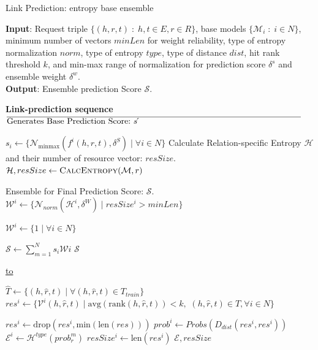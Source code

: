 \documentclass{article}
\begin{document}
\begin{algorithm}[!htb]
    \caption{Link Prediction: entropy base ensemble}
    \label{alg:linkPredictOverview}
    \textbf{Input}: Request triple $\{(h, r, t) \;:\; h,t \in E, r \in R\}$, base models $\{\mathcal{M}_i \;:\; i \in N\}$, minimum number of vectors $minLen$ for weight reliability, type of entropy normalization $norm$, type of entropy $\mathit{type}$, type of distance $\mathit{dist}$, hit rank threshold $k$, and min-max range of normalization for prediction score $\delta^{s}$ and ensemble weight $\delta^{w}$.\\
    \textbf{Output}: Ensemble prediction Score $\mathcal{S}$.
    
    \begin{algorithmic}[1] %

        \Statex \hrulefill
        \Statex \textbf{Link-prediction sequence}
        \Statex \noindent$\overline{\makebox[\linewidth]{\text{Generates Base Prediction Score:} $s\acute{}$ \hfill}}$
        
        \State $s\acute{}_i \leftarrow \{\mathcal{N}_{\text{minmax}}(f^i(h, r, t), \delta^{S}) \;|\; \forall i \in N\}$    
        \Statex Calculate Relation-specific Entropy $\mathcal{H}$ and their number of resource vector: $resSize$.
        \State $\mathcal{H}, resSize \leftarrow \Call{CalcEntropy}{\mathcal{M}, r}$

        \Statex Ensemble for Final Prediction Score: $\mathcal{S}$.
        \State $\mathcal{W}^i \leftarrow \{\mathcal{N}_{norm}(\mathcal{H}^i, \delta^{W}) \;|\; resSize^{i}>minLen\}$

            \State $\mathcal{W}^i \leftarrow \{1\;|\; \forall i \in N\}$
        \EndIf
        
        \State $\mathcal{S} \leftarrow \sum_{m=1}^{N} s\acute{}_i \mathcal{W}i$
        \State \Return $\mathcal{S}$
        
        \Statex \hrulefill
        \Statex \noindent\underline{\hbox to }


            \State $\hat{T} \leftarrow \{(h,\hat{r},t)\;|\; \forall (h,\hat{r},t) \in T_{train}\}$
            \State $res^{i} \leftarrow \{\mathcal{V}^i(h,\hat{r},t) \;|\;\mathrm{avg}(\mathrm{rank}(h,\hat{r},t)) <k,$
            \Statex \hspace{3.5em}$(h,\hat{r},t) \in \hat{T}, \forall i \in N\}$
        
                \State ${res^{i}} \leftarrow \mathrm{drop}(res^{i}, \mathrm{min}(\mathrm{len}(res)))$
                \State $prob^{i} \leftarrow Probs(D_{\mathit{dist}}(res^{i}, res^{i}))$
                \State $\mathcal{E}^{i} \leftarrow \mathcal{H}^{\mathit{type}}(prob_r^m)$
                \State $resSize^{i} \leftarrow \mathrm{len}(res^{i})$  
            \EndFor
            \State \Return $\mathcal{E}, resSize$
        \EndFunction
    \end{algorithmic}
\end{algorithm}
\end{document}

